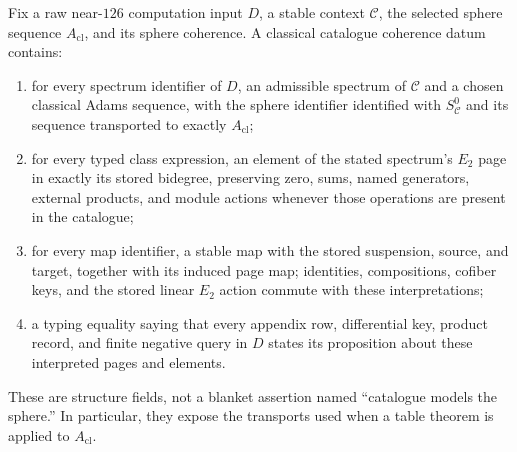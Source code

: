 \begin{definition}
  \label{def:classical-catalogue-coherence}
  \notready
  Fix a raw near-$126$ computation input $D$, a stable context $\mathcal C$,
  the selected sphere sequence $A_{\mathrm{cl}}$, and its sphere coherence.
  A classical catalogue coherence datum contains:
  \begin{enumerate}
    \item for every spectrum identifier of $D$, an admissible spectrum of
      $\mathcal C$ and a chosen classical Adams sequence, with the sphere
      identifier identified with $S^0_{\mathcal C}$ and its sequence
      transported to exactly $A_{\mathrm{cl}}$;
    \item for every typed class expression, an element of the stated spectrum's
      $E_2$ page in exactly its stored bidegree, preserving zero, sums, named
      generators, external products, and module actions whenever those
      operations are present in the catalogue;
    \item for every map identifier, a stable map with the stored suspension,
      source, and target, together with its induced page map; identities,
      compositions, cofiber keys, and the stored linear $E_2$ action commute
      with these interpretations;
    \item a typing equality saying that every appendix row, differential key,
      product record, and finite negative query in $D$ states its proposition
      about these interpreted pages and elements.
  \end{enumerate}
  These are structure fields, not a blanket assertion named
  ``catalogue models the sphere.''  In particular, they expose the transports
  used when a table theorem is applied to $A_{\mathrm{cl}}$.
\end{definition}
